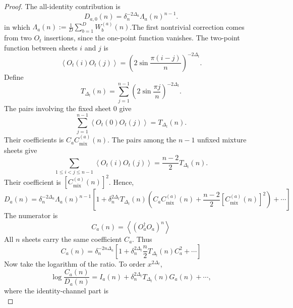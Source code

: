 \documentclass{article}
\theoremstyle{plain}
\theoremstyle{definition}
\theoremstyle{plain}
\begin{document}
\begin{proof}
The all-identity contribution is
\begin{equation}
   D_{a, 0}(n)=\delta_n^{-2 \Delta_a} \Lambda_a(n)^{n-1} . 
\end{equation}
in which $\Lambda_a(n):=\frac{1}{D} \sum_{b=1}^D W_b^{(a)}(n)$.The first nontrivial correction comes from two $O_t$ insertions, since the one-point function vanishes. The two-point function between sheets $i$ and $j$ is
\begin{equation}
    \left\langle O_t(i) O_t(j)\right\rangle=\left(2 \sin \frac{\pi(i-j)}{n}\right)^{-2 \Delta_t} .
\end{equation}
Define
\begin{equation}
   T_{\Delta_t}(n)=\sum_{j=1}^{n-1}\left(2 \sin \frac{\pi j}{n}\right)^{-2 \Delta_t} . 
\end{equation}
The pairs involving the fixed sheet 0 give
\begin{equation}
   \sum_{j=1}^{n-1}\left\langle O_t(0) O_t(j)\right\rangle=T_{\Delta_t}(n) . 
\end{equation}
Their coefficients is $C_a C_{\operatorname{mix}}^{(a)}(n)$. The pairs among the $n-1$ unfixed mixture sheets give
\begin{equation}
    \sum_{1 \leq i<j \leq n-1}\left\langle O_t(i) O_t(j)\right\rangle=\frac{n-2}{2} T_{\Delta_t}(n) .
\end{equation}
Their coefficient is $
\left[C_{\operatorname{mix}}^{(a)}(n)\right]^2$. Hence,
\begin{equation}
  D_a(n)=\delta_n^{-2 \Delta_a} \Lambda_a(n)^{n-1}\left[1+\delta_n^{2 \Delta_t} T_{\Delta_t}(n)\left(C_a C_{\text {mix }}^{(a)}(n)+\frac{n-2}{2}\left[C_{\text {mix }}^{(a)}(n)\right]^2\right)+\cdots\right]
\end{equation}
The numerator is
\begin{equation}
C_a(n)=\left\langle\left(O_a^{\dagger} O_a\right)^n\right\rangle  
\end{equation}
All $n$ sheets carry the same coefficient $C_a$. Thus
\begin{equation}
  C_a(n)=\delta_n^{-2 n \Delta_a}\left[1+\delta_n^{2 \Delta_t} \frac{n}{2} T_{\Delta_t}(n) C_a^2+\cdots\right]  
\end{equation}
Now take the logarithm of the ratio. To order $x^{2 \Delta_t}$,
\begin{equation}
  \log \frac{C_a(n)}{D_a(n)}=I_a(n)+\delta_n^{2 \Delta_t} T_{\Delta_t}(n) G_a(n)+\cdots,
\end{equation}
where the identity-channel part is
\begin{equation}

\end{equation}
\end{proof}
\end{document}
